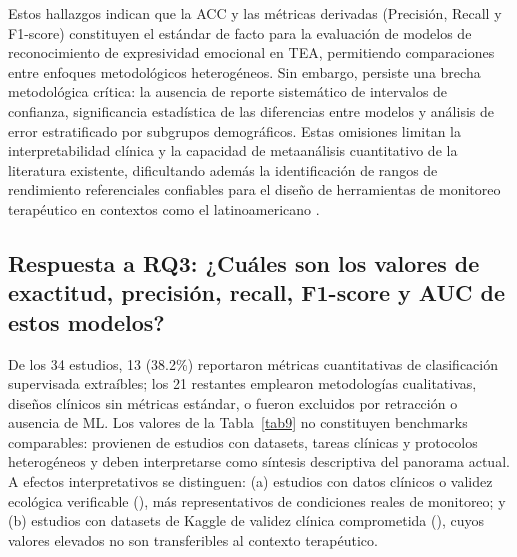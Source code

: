 \documentclass[ASNA,twocolumn]{USG}
\begin{document}
	Estos hallazgos indican que la ACC y las métricas derivadas (Precisión, Recall y
	F1-score) constituyen el estándar de facto para la evaluación de modelos de
	reconocimiento de expresividad emocional en TEA, permitiendo comparaciones entre
	enfoques metodológicos heterogéneos. Sin embargo, persiste una brecha metodológica
	crítica: la ausencia de reporte sistemático de intervalos de confianza, significancia
	estadística de las diferencias entre modelos y análisis de error estratificado por
	subgrupos demográficos. Estas omisiones limitan la interpretabilidad clínica y la
	capacidad de metaanálisis cuantitativo de la literatura existente, dificultando
	además la identificación de rangos de rendimiento referenciales confiables para el
	diseño de herramientas de monitoreo terapéutico en contextos como el latinoamericano
	\cite{Radocaj2025,Hosney2024}.
	
	\subsection{Respuesta a RQ3: ¿Cuáles son los valores de exactitud, precisión,
		recall, F1-score y AUC de estos modelos?}\label{sec4c}
	
	De los 34 estudios, 13 (38.2\%) reportaron métricas cuantitativas de clasificación
	supervisada extraíbles; los 21 restantes emplearon metodologías cualitativas,
	diseños clínicos sin métricas estándar, o fueron excluidos por retracción o
	ausencia de ML. Los valores de la Tabla~\ref{tab9} no constituyen benchmarks
	comparables: provienen de estudios con datasets, tareas clínicas y protocolos
	heterogéneos y deben interpretarse como síntesis descriptiva del panorama actual.
	A efectos interpretativos se distinguen: (a) estudios con datos clínicos o validez
	ecológica verificable (\cite{Johnson2025,Radocaj2025,Washington2022,Sariyanidi2025,Hassan2025,Rudovic2019,Hwang2024}),
	más representativos de condiciones reales de monitoreo; y (b) estudios con datasets
	de Kaggle de validez clínica comprometida
	(\cite{Aljbori2025,Ramachandran2025,Hosney2024}), cuyos valores elevados no son
	transferibles al contexto terapéutico.
	
\end{document}
